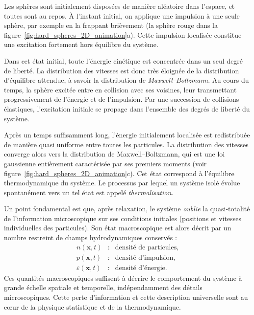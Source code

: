\smallskip

Les sphères sont initialement disposées de manière aléatoire dans l’espace, et toutes sont au repos. À l’instant initial, on applique une impulsion à une seule sphère, par exemple en la frappant brièvement (la sphère rouge dans la figure~\ref{fig:hard_spheres_2D_animation}a). Cette impulsion localisée constitue une excitation fortement hors équilibre du système.

\smallskip

Dans cet état initial, toute l’énergie cinétique est concentrée dans un seul degré de liberté. La distribution des vitesses est donc très éloignée de la distribution d’équilibre attendue, à savoir la distribution de \emph{Maxwell--Boltzmann}. Au cours du temps, la sphère excitée entre en collision avec ses voisines, leur transmettant progressivement de l’énergie et de l’impulsion. Par une succession de collisions élastiques, l’excitation initiale se propage dans l’ensemble des degrés de liberté du système.

\smallskip

Après un temps suffisamment long, l’énergie initialement localisée est redistribuée de manière quasi uniforme entre toutes les particules. La distribution des vitesses converge alors vers la distribution de Maxwell--Boltzmann, qui est une loi gaussienne entièrement caractérisée par ses premiers moments (voir figure~\ref{fig:hard_spheres_2D_animation}c).
Cet état correspond à l’équilibre thermodynamique du système. Le processus par lequel un système isolé évolue spontanément vers un tel état est appelé \emph{thermalisation}.

\smallskip

Un point fondamental est que, après relaxation, le système \emph{oublie} la quasi-totalité de l’information microscopique sur ses conditions initiales (positions et vitesses individuelles des particules).
Son état macroscopique est alors décrit par un nombre restreint de champs hydrodynamiques conservés :
\begin{eqnarray}
    n(\mathbf{x},t) & : & \text{densité de particules}, \nonumber \\
    p(\mathbf{x},t) & : & \text{densité d’impulsion}, \nonumber \\
    \varepsilon(\mathbf{x},t) & : & \text{densité d’énergie}. \nonumber
\end{eqnarray}
Ces quantités macroscopiques suffisent à décrire le comportement du système à grande échelle spatiale et temporelle, indépendamment des détails microscopiques. Cette perte d’information et cette description universelle sont au cœur
de la physique statistique et de la thermodynamique.

